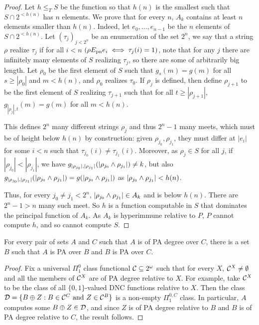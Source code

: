 \begin{proof}
  Let $h\leq_T S$ be the function so that $h(n)$ is the smallest such that $S\cap2^{<h(n)}$ has $n$ elements. We prove that for every $n$, $A_k$ contains at least $n$ elements smaller than $h(n)$. Indeed, let $e_0,\dots,e_{n-1}$ be the $n$ elements of $S\cap 2^{<h(n)}$. Let $(\tau_j)_{j<2^n}$ be an enumeration of the set $2^n$, we say that a string $\rho$ realize $\tau_j$ if for all $i<n$ $(\rho E_{\mathrm{pn}} e_i\iff\tau_j(i)=1)$, note that for any $j$ there are infinitely many elements of $S$ realizing $\tau_j$, so there are some of arbitrarily big length. Let $\rho_0$ be the first element of $S$ such that $g_{s}(m)=g(m)$ for all $s\geq |\rho_0|$ and $m<h(n)$, and $\rho_0$ realizes $\tau_0$. %
  If $\rho_j$ is defined, then define $\rho_{j+1}$ to be the first element of $S$ realizing $\tau_{j+1}$ such that for all $t\geq|\rho_{j+1}|$, $g_{|\rho_j|, t}(m)=g(m)$ for all $m<h(n)$.

  This defines $2^n$ many different strings $\rho_j$ and thus $2^n-1$ many meets, which must be of height below $h(n)$ by construction: given $\rho_{j_0},\rho_{j_1}$, they must differ at $|e_i|$ for some $i<n$ such that $\tau_{j_0}(i)\neq \tau_{j_1}(i)$.
  Moreover, as $\rho_j\in S$ for all $j$, if $|\rho_{j_0}|<|\rho_{j_1}|$, we have $g_{|\rho_{j_0}|,|\rho_{j_1}|}(|\rho_{j_0}\wedge\rho_{j_1}|)\neq k$, but also $g_{|\rho_{j_0}|,|\rho_{j_1}|}(|\rho_{j_0}\wedge\rho_{j_1}|)=g(|\rho_{j_0}\wedge\rho_{j_1}|)$ as $|\rho_{j_0}\wedge\rho_{j_1}|<h(n)$.

  Thus, for every $j_0\neq j_1<2^n$, $|\rho_{j_0}\wedge\rho_{j_1}|\in A_k$ and is below $h(n)$. There are $2^n-1>n$ many such meet. So $h$ is a function computable in $S$ that dominates the principal function of $A_k$. As $A_k$ is hyperimmune relative to $P$, $P$ cannot compute $h$, and so cannot compute $S$.
\end{proof}



\begin{lemma}\label{lem:pa-degree-dense}
For every pair of sets $A$ and $C$ such that $A$ is of PA degree over $C$,
there is a set $B$ such that $A$ is PA over $B$ and $B$ is PA over $C$.
\end{lemma}
\begin{proof}
Fix a universal $\Pi^0_1$ class functional $\mathcal{C} \subseteq 2^\omega$ such that for every $X$, $\mathcal{C}^X \neq \emptyset$ and all the members of $\mathcal{C}^X$ are of PA degree relative to $X$. For example, take $\mathcal{C}^X$ to be the class of all $\{0,1\}$-valued DNC functions relative to $X$. Then the class $\mathcal{D} = \{B\oplus Z: B \in \mathcal{C}^{C} \mbox{ and } Z \in \mathcal{C}^B \}$ is a non-empty $\Pi^{0,C}_1$ class. In particular, $A$ computes some $B \oplus Z \in \mathcal{D}$, and since $Z$ is of PA degree relative to $B$ and $B$ is of PA degree relative to $C$, the result follows.
\end{proof}

